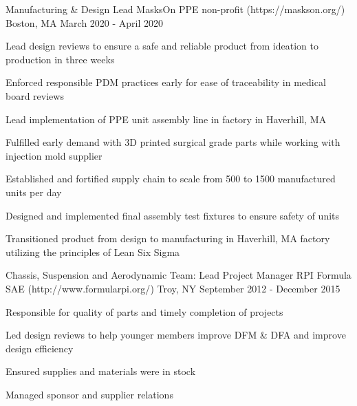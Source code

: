 

\begin{cventries}

    
  \cventry
    {Manufacturing \& Design Lead} %
    {MasksOn PPE non-profit ({\tiny https://maskson.org/})} %
    {Boston, MA} %
    {March 2020 - April 2020} %
    {
      \begin{cvitems} %
        \item{Lead design reviews to ensure a safe and reliable product from ideation to production in three weeks}
        \item{Enforced responsible PDM practices early for ease of traceability in medical board reviews}
        \item{Lead implementation of PPE unit assembly line in factory in Haverhill, MA}
        \item{Fulfilled early demand with 3D printed surgical grade parts while working with injection mold supplier}
        \item{Established and fortified supply chain to scale from 500 to 1500 manufactured units per day}
        \item{Designed and implemented final assembly test fixtures to ensure safety of units}
        \item{Transitioned product from design to manufacturing in Haverhill, MA factory utilizing the principles of Lean Six Sigma}
      \end{cvitems}
    }

  \cventry
    {Chassis, Suspension and Aerodynamic Team: Lead Project Manager} %
    {RPI Formula SAE ({\tiny http://www.formularpi.org/})} %
    {Troy, NY} %
    {September 2012 - December 2015} %
    {
      \begin{cvitems} %
        \item {Responsible for quality of parts and timely completion of projects}
        \item{Led design reviews to help younger members improve DFM \& DFA and improve design efficiency}
        \item{Ensured supplies and materials were in stock}
        \item{Managed sponsor and supplier relations}
      \end{cvitems}
    }
    

\end{cventries}

